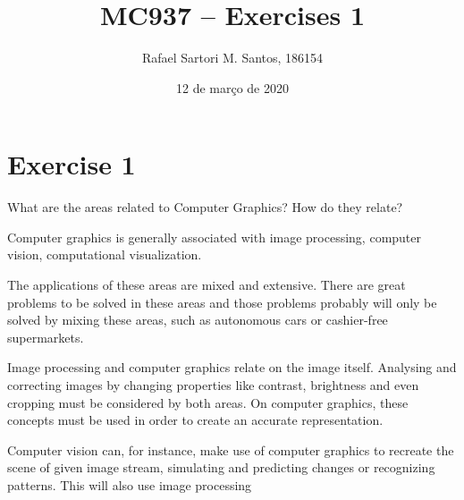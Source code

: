 \documentclass[english,a4paper]{article}
\title{MC937 -- Exercises 1}
\author{Rafael Sartori M. Santos, 186154}
\date{12 de março de 2020}
\begin{document}
\maketitle

\section*{Exercise 1}

  What are the areas related to Computer Graphics?  How do they relate?

  \begin{mdframed}
    \begin{small}
      Computer graphics is generally associated with image processing, computer vision, computational visualization.

      The applications of these areas are mixed and extensive. There are great problems to be solved in these areas and those problems probably will only be solved by mixing these areas, such as autonomous cars or cashier-free supermarkets.

      Image processing and computer graphics relate on the image itself. Analysing and correcting images by changing properties like contrast, brightness and even cropping must be considered by both areas. On computer graphics, these concepts must be used in order to create an accurate representation.

      Computer vision can, for instance, make use of computer graphics to recreate the scene of given image stream, simulating and predicting changes or recognizing patterns. This will also use image processing
    \end{small}
  \end{mdframed}
\end{document}
